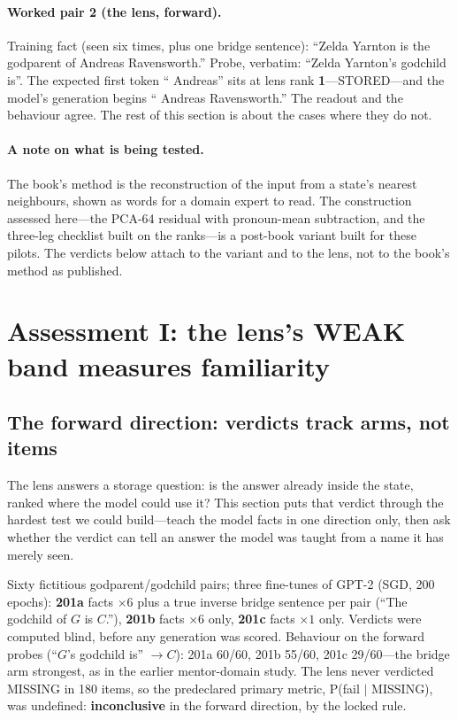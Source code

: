 \documentclass[11pt]{article}
\begin{document}
\paragraph{Worked pair 2 (the lens, forward).}
Training fact (seen six times, plus one bridge sentence): ``Zelda
Yarnton is the godparent of Andreas Ravensworth.'' Probe, verbatim:
``Zelda Yarnton's godchild is''. The expected first token `` Andreas''
sits at lens rank \textbf{1}---STORED---and the model's generation
begins `` Andreas Ravensworth.'' The readout and the behaviour agree.
The rest of this section is about the cases where they do not.

\paragraph{A note on what is being tested.} The book's method \cite{nussbaum_book} is the reconstruction of the input from a state's nearest neighbours, shown as words for a domain expert to read. The construction assessed here---the PCA-64 residual with pronoun-mean subtraction, and the three-leg checklist built on the ranks---is a post-book variant built for these pilots. The verdicts below attach to the variant and to the lens, not to the book's method as published.

\section{Assessment I: the lens's WEAK band measures familiarity}
\label{sec:lens}

\subsection{The forward direction: verdicts track arms, not items}

The lens answers a storage question: is the answer already inside
the state, ranked where the model could use it? This section puts
that verdict through the hardest test we could build---teach the
model facts in one direction only, then ask whether the verdict can
tell an answer the model was taught from a name it has merely seen.

Sixty fictitious godparent/godchild pairs; three fine-tunes of GPT-2
(SGD, 200 epochs): \textbf{201a} facts $\times 6$ plus a true inverse
bridge sentence per pair (``The godchild of $G$ is $C$.''), \textbf{201b}
facts $\times 6$ only, \textbf{201c} facts $\times 1$ only. Verdicts
were computed blind, before any generation was scored. Behaviour on the
forward probes (``$G$'s godchild is'' $\to C$): 201a 60/60, 201b
55/60, 201c 29/60---the bridge arm strongest, as in the earlier
mentor-domain study. The lens never verdicted MISSING in 180 items, so
the predeclared primary metric, P(fail $\mid$ MISSING), was undefined:
\textbf{inconclusive} in the forward direction, by the locked rule.
\end{document}
